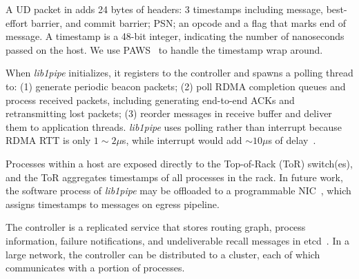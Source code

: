 A UD packet in \sys{} adds 24 bytes of headers: 3 timestamps including message, best-effort barrier, and commit barrier; PSN; an opcode and a flag that marks end of message.
A timestamp is a 48-bit integer, indicating the number of nanoseconds passed on the host. %
We use PAWS~\cite{jacobson1992tcp} to handle the timestamp wrap around.



When \textit{lib1pipe} initializes, it registers to the controller and spawns a polling thread to: (1) generate periodic beacon packets; (2) poll RDMA completion queues and process received packets, including generating end-to-end ACKs and retransmitting lost packets; (3) reorder messages in receive buffer and deliver them to application threads.
\textit{lib1pipe} uses polling rather than interrupt because RDMA RTT is only $1\sim2 \mu$s, while interrupt would add $\sim10 \mu$s of delay~\cite{yang2012poll}.

Processes within a host are exposed directly to the Top-of-Rack (ToR) switch(es), and the ToR aggregates timestamps of all processes in the rack.
In future work, the software process of \textit{lib1pipe} may be offloaded to a programmable NIC~\cite{kaufmann2016high,firestone2018azure}, which assigns timestamps to messages on egress pipeline.

The controller is a replicated service that stores routing graph, process information, failure notifications, and undeliverable recall messages in etcd~\cite{etcd}.
In a large network, the controller can be distributed to a cluster, each of which communicates with a portion of processes.



